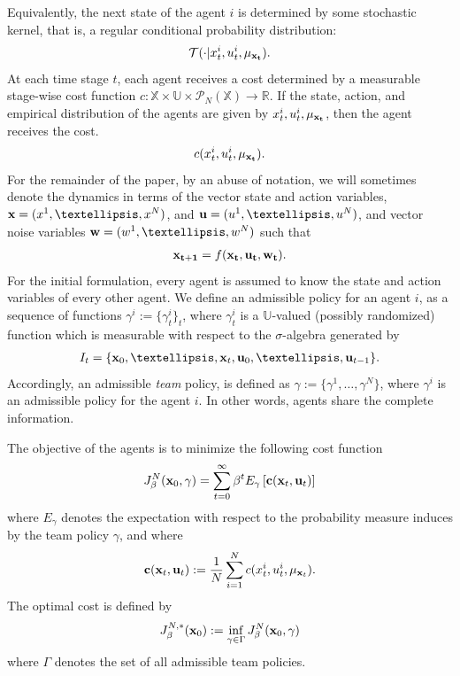 \documentclass[twoside,11pt]{article}
\begin{document}
Equivalently, the next state of the agent $i$ is determined by some stochastic kernel, that is, a regular conditional probability distribution:
\begin{align}\label{kernel_common_noise}
\mathcal{T}(\cdot|x_t^i,u_t^i,\mu_{\bf x_t}).
\end{align}
At each time stage $t$, each agent receives a cost determined by a measurable stage-wise cost function $c:\mathds{X}\times\mathds{U}\times \mathcal{P}_N(\mathds{X})\to \mathds{R}$. If the state, action, and empirical distribution of the agents are given by $x_t^i,u_t^i,\mu_{\bf x_t}$, then the agent receives the cost. 
\begin{align*}
c(x_t^i,u_t^i,\mu_{\bf x_t}).
\end{align*}
For the remainder of the paper, by an abuse of notation, we will sometimes denote the dynamics in terms of the vector state and action variables, ${\bf x}=(x^1,\dots,x^N)$, and ${\bf u}=(u^1,\dots,u^N)$, and vector noise variables ${\bf w}=(w^1,\dots,w^N)$ such that
\begin{align*}
{\bf x_{t+1}}=f({\bf x_t,u_t,w_t}).
\end{align*}
For the initial formulation, every agent is assumed to know the state and action variables of every other agent. We define an admissible policy for an agent $i$, as a sequence of functions $\gamma^i:=\{\gamma^i_t\}_t$, where $\gamma^i_t$ is a $\mathds{U}$-valued (possibly randomized) function which is measurable with respect to the $\sigma$-algebra generated by 
\begin{align}\label{info}
I_t=\{{\bf x}_0,\dots,{\bf x}_t,{\bf u}_0,\dots,{\bf u}_{t-1}\}.
\end{align}
Accordingly, an admissible {\it team} policy, is defined as $\gamma:=\{\gamma^1,\dots,\gamma^N\}$, where $\gamma^i$ is an admissible policy for the agent $i$. In other words, agents share the complete information.

The objective of the agents is to minimize the following cost function
\begin{align*}
J^N_\beta({\bf x}_0,\gamma)=\sum_{t=0}^{\infty}\beta^tE_\gamma\left[{\bf c}({\bf x}_t,{\bf u}_t)\right]
\end{align*}
where $E_\gamma$ denotes the expectation with respect to the probability measure induces by the team policy $\gamma$, and where
\begin{align*}
{\bf c}({\bf x}_t,{\bf u}_t):=\frac{1}{N}\sum_{i=1}^Nc(x^i_t,u^i_t,\mu_{{\bf x}_t}).
\end{align*}
The optimal cost is defined by
\begin{align}\label{opt_cost}
J_\beta^{N,*}({\bf x}_0):=\inf_{\gamma\in\Gamma}J_\beta^N({\bf x}_0,\gamma)
\end{align}
where $\Gamma$ denotes the set of all admissible team policies.
\end{document}
